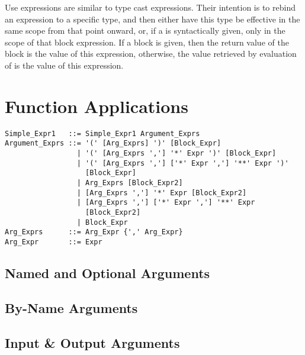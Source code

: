 Use expressions are similar to type cast expressions. Their intention is to rebind an expression to a specific type, and then either have this type be effective in the same scope from that point onward, or, if a  is syntactically given, only in the scope of that block expression. If a block is given, then the return value of the block is the value of this expression, otherwise, the value retrieved by evaluation of  is the value of this expression. 








\section{Function Applications}
\label{sec:function-applications}

\syntax\begin{lstlisting}
Simple_Expr1   ::= Simple_Expr1 Argument_Exprs 
Argument_Exprs ::= '(' [Arg_Exprs] ')' [Block_Expr]
                 | '(' [Arg_Exprs ','] '*' Expr ')' [Block_Expr]
                 | '(' [Arg_Exprs ','] ['*' Expr ','] '**' Expr ')'
                   [Block_Expr]
                 | Arg_Exprs [Block_Expr2]
                 | [Arg_Exprs ','] '*' Expr [Block_Expr2]
                 | [Arg_Exprs ','] ['*' Expr ','] '**' Expr
                   [Block_Expr2]
                 | Block_Expr
Arg_Exprs      ::= Arg_Expr {',' Arg_Expr}
Arg_Expr       ::= Expr
\end{lstlisting}







\subsection{Named and Optional Arguments}
\label{sec:named-optional-arguments}

\subsection{By-Name Arguments}
\label{sec:by-name-arguments}

\subsection{Input \& Output Arguments}
\label{sec:io-arguments}

